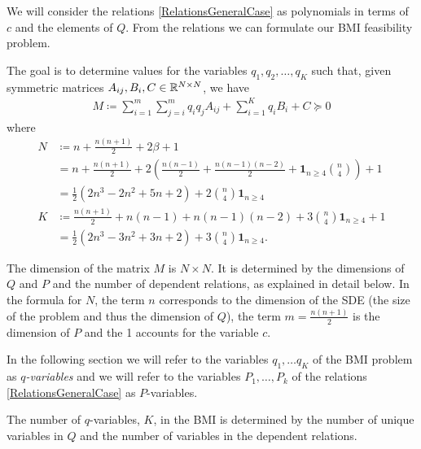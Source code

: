 \documentclass[a4paper,12pt,twoside,BCOR=10mm]{scrbook}
\begin{document}
We will consider the relations \eqref{RelationsGeneralCase} as polynomials in terms of $c$ and the elements of $Q$. From the relations we can formulate our BMI feasibility problem.

The goal is to determine values for the variables $q_1, q_2, \ldots, q_K$ such that, given symmetric matrices $A_{ij}, B_i, C \in \mathbb{R}^{N\times N}$, we have
\begin{align}\label{BMIgeneralNotDefinition}
    M \coloneqq \sum_{i = 1}^m \sum_{j = i}^m q_iq_jA_{ij} + \sum_{i = 1}^Kq_iB_i + C \succeq 0
\end{align}
where
\begin{align*}
    N &\coloneqq n + \frac{n(n+1)}{2} + 2\beta + 1\\
    &= n + \frac{n(n+1)}{2} + 2\left(\frac{n(n-1)}{2}+ \frac{n(n-1)(n-2)}{2} + \mathbf{1}_{n\geq4}\binom{n}{4}\right) + 1\\
    &= \frac{1}{2}(2n^3 - 2n^2 + 5n + 2) + 2\binom{n}{4}\mathbf{1}_{n\geq4}\\
    K &\coloneqq \frac{n(n+1)}{2} + n(n-1) + n(n-1)(n-2) + 3\binom{n}{4}\mathbf{1}_{n\geq 4} + 1\\
    &= \frac{1}{2}(2n^3 - 3n^2 + 3n + 2) + 3\binom{n}{4}\mathbf{1}_{n\geq4}.
\end{align*}

The dimension of the matrix $M$ is $N\times N$. It is determined by the dimensions of $Q$ and $P$ and the number of dependent relations, as explained in detail below. In the formula for $N$, the term $n$ corresponds to the dimension of the SDE (the size of the problem and thus the dimension of $Q$), the term $m = \frac{n(n + 1)}{2}$ is the dimension of $P$ and the 1 accounts for the variable $c$.

In the following section we will refer to the variables $q_1, \ldots q_K$ of the BMI problem as $q$\textit{-variables} and we will refer to the variables $P_1, \ldots, P_k$ of the relations \eqref{RelationsGeneralCase} as $P$-variables.

The number of $q$-variables, $K$, in the BMI is determined by the number of unique variables in $Q$ and the number of variables in the dependent relations.
\end{document}

